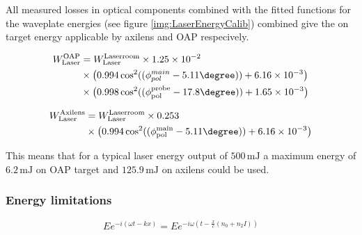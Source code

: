 All measured losses in optical components combined with the fitted functions for the waveplate energies (see figure \ref{img:LaserEnergyCalib}) combined give the on target energy applicable by axilens and OAP respecively.

\begin{align*}
 W_\mathrm{Laser}^\mathrm{OAP} &= W_\mathrm{Laser}^\mathrm{Laserroom}\times 1.25\times10^{-2}\\ 
 &\times\big( 0.994 \cos^2((\phi_{pol}^{main}-5.11\degree)) +6.16\times 10^{-3}\big)\\
  &\times \big(0.998 \cos^2((\phi_\mathrm{pol}^\mathrm{probe}-17.8\degree )) +1.65\times 10^{-3}\big)
\end{align*}


\begin{align}
 W_\mathrm{Laser}^\mathrm{Axilens} &= W_\mathrm{Laser}^\mathrm{Laserroom}\times 0.253\\
  &\times\big( 0.994 \cos^2((\phi_\mathrm{pol}^\mathrm{main}-5.11\degree)) +6.16\times 10^{-3}\big)\\
\end{align}



This means that for a typical laser energy output of $500\, \mathrm{mJ}$ a maximum energy of $6.2\, \mathrm{mJ}$ on OAP target and $125.9\,\mathrm{mJ}$ on axilens could be used.
\subsubsection{Energy limitations}

\begin{equation}
E e^{-i(\omega t-kx)}=E e^{-i\omega(t-\frac{x}{c}(n_0+n_2 I) )}
\end{equation}


